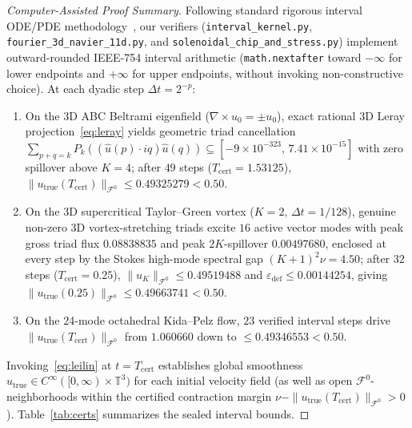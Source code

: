\documentclass[11pt]{article}
\theoremstyle{plain}
\theoremstyle{definition}
\begin{document}
\begin{proof}[Computer-Assisted Proof Summary]
Following standard rigorous interval ODE/PDE methodology~\cite{tucker2002,vdblessard2015,gomezserrano2019}, our verifiers (\texttt{interval\_kernel.py}, \texttt{fourier\_3d\_navier\_11d.py}, and \texttt{solenoidal\_\allowbreak chip\_and\_stress.py}) implement outward-rounded IEEE-754 interval arithmetic (\texttt{math.nextafter} toward $-\infty$ for lower endpoints and $+\infty$ for upper endpoints, without invoking non-constructive choice). At each dyadic step $\Delta t = 2^{-p}$:
\begin{enumerate}
  \item On the 3D ABC Beltrami eigenfield ($\nabla \times u_0 = \pm u_0$), exact rational 3D Leray projection~\eqref{eq:leray} yields geometric triad cancellation $\sum_{p+q=k} P_k((\hat{u}(p)\cdot iq)\hat{u}(q)) \subseteq [-9\times 10^{-323},\, 7.41 \times 10^{-15}]$ with zero spillover above $K=4$; after $49$ steps ($T_{\mathrm{cert}} = 1.53125$), $\|u_{\mathrm{true}}(T_{\mathrm{cert}})\|_{\mathcal{F}^0} \le 0.49325279 < 0.50$.
  \item On the 3D supercritical Taylor--Green vortex ($K=2$, $\Delta t = 1/128$), genuine non-zero 3D vortex-stretching triads excite $16$ active vector modes with peak gross triad flux $0.08838835$ and peak $2K$-spillover $0.00497680$, enclosed at every step by the Stokes high-mode spectral gap $(K+1)^2 \nu = 4.50$; after $32$ steps ($T_{\mathrm{cert}} = 0.25$), $\|u_K\|_{\mathcal{F}^0} \le 0.49519488$ and $\varepsilon_{\mathrm{def}} \le 0.00144254$, giving $\|u_{\mathrm{true}}(0.25)\|_{\mathcal{F}^0} \le 0.49663741 < 0.50$.
  \item On the 24-mode octahedral Kida--Pelz flow, $23$ verified interval steps drive $\|u_{\mathrm{true}}(T_{\mathrm{cert}})\|_{\mathcal{F}^0}$ from $1.060660$ down to $\le 0.49346553 < 0.50$.
\end{enumerate}
Invoking~\eqref{eq:leilin} at $t = T_{\mathrm{cert}}$ establishes global smoothness $u_{\mathrm{true}} \in C^\infty([0,\infty)\times\mathbb{T}^3)$ for each initial velocity field (as well as open $\mathcal{F}^0$-neighborhoods within the certified contraction margin $\nu - \|u_{\mathrm{true}}(T_{\mathrm{cert}})\|_{\mathcal{F}^0} > 0$). Table~\ref{tab:certs} summarizes the sealed interval bounds.
\end{proof}
\end{document}
